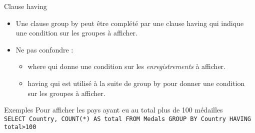 \documentclass[10pt]{beamer}
\begin{document}
\begin{frame}{\Ctitle}{\stitle}
	\begin{alertblock}{Clause {\sc having}}
		\begin{itemize}
			\item<1-> Une clause {\sc group by} peut être complété par une clause {\sc having} qui indique une condition sur les groupes à afficher.
			\item<2-> \textcolor{BrickRed}{\small \important} Ne pas confondre :
			\begin{itemize}
				\item<3-> {\sc where} qui donne une condition sur les \textit{enregistrements} à afficher.
				\item<4-> {\sc having} qui est utilisé à la suite de {\sc group by} pour donner une condition sur les groupes à afficher.
			\end{itemize}
		\end{itemize}
	\end{alertblock}
	\begin{exampleblock}{Exemples}
		Pour afficher les pays ayant eu au total plus de 100 médailles\\
		\onslide<4->\texttt{SELECT Country, COUNT(*) AS total FROM Medals GROUP BY Country HAVING total>100}
	\end{exampleblock}
\end{frame}
\end{document}
